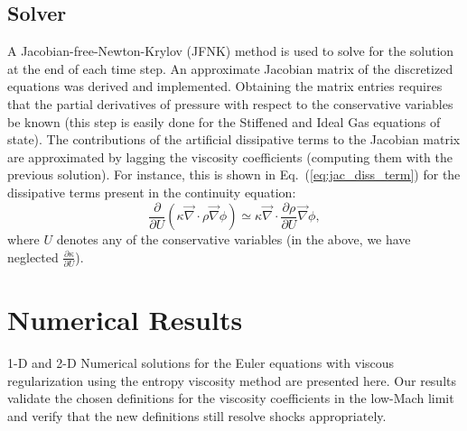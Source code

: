 \documentclass[preprint,10pt]{elsarticle}
\renewcommand{\div}{\vec{\nabla}\! \cdot \!}
\newcommand{\grad}{\vec{\nabla}}
\newcommand{\eqt}[1]{Eq.~(\ref{#1})}                     %
\begin{document}
\subsection{Solver} \label{sec:solver}
A Jacobian-free-Newton-Krylov (JFNK) method is used to solve for the solution at the end of each time step. An approximate Jacobian matrix of the discretized equations was derived and implemented. Obtaining the matrix entries requires that the partial derivatives of pressure with respect to the conservative variables be known (this step is easily done for the Stiffened and Ideal Gas equations of state). The contributions of the artificial dissipative terms to the Jacobian matrix are approximated by lagging the viscosity coefficients (computing them with the previous solution). For instance, this is shown in \eqt{eq:jac_diss_term} for the dissipative terms present in the continuity equation:
\begin{equation}
\label{eq:jac_diss_term}
\frac{\partial}{\partial U} \left( \kappa \div \rho \grad \phi \right) \simeq \kappa \div \frac{\partial \rho}{\partial U} \grad \phi ,
\end{equation}  
where $U$ denotes any of the conservative variables (in the above, we have neglected $\frac{\partial \kappa}{\partial U} $).

\section{Numerical Results} \label{sec:results}

1-D and 2-D Numerical solutions for the Euler equations with viscous regularization using the entropy viscosity method are presented here.
Our results validate the chosen definitions for the viscosity coefficients in the low-Mach limit and verify that the new definitions still resolve shocks appropriately. 
\end{document}
